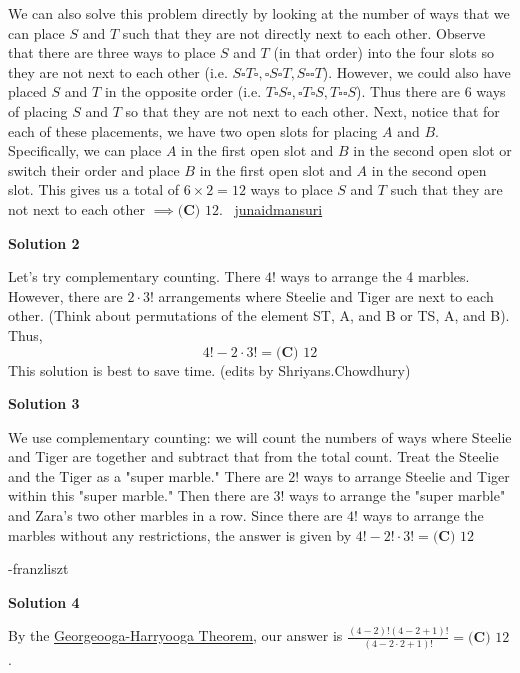 \begin{enumerate}
 We can also solve this problem directly by looking at the number of ways that we can place $S$ and $T$ such that they are not directly next to each other. Observe that there are three ways to place $S$ and $T$ (in that order) into the four slots so they are not next to each other (i.e. $S\square T\square, \square S\square T, S\square\square T$). However, we could also have placed $S$ and $T$ in the opposite order (i.e. $T\square S\square, \square T\square S, T\square\square S$). Thus there are 6 ways of placing $S$ and $T$ so that they are not next to each other. Next, notice that for each of these placements, we have two open slots for placing $A$ and $B$. Specifically, we can place $A$ in the first open slot and $B$ in the second open slot or switch their order and place $B$ in the first open slot and $A$ in the second open slot. This gives us a total of $6\times 2=12$ ways to place $S$ and $T$ such that they are not next to each other $\implies\boxed{\textbf{(C) }12}$.
~\href{https://artofproblemsolving.com/community/user/jmansuri}{junaidmansuri}

 



\textbf{Solution 2}

Let's try complementary counting. There $4!$ ways to arrange the 4 marbles. However, there are $2\cdot3!$ arrangements where Steelie and Tiger are next to each other. (Think about permutations of the element ST, A, and B or TS, A, and B). Thus, 
 \[4!-2\cdot3!=\boxed{\textbf{(C) }12}\] This solution is best to save time. (edits by Shriyans.Chowdhury)

 



\textbf{Solution 3}

We use complementary counting: we will count the numbers of ways where Steelie and Tiger are together and subtract that from the total count. Treat the Steelie and the Tiger as a "super marble." There are $2!$ ways to arrange Steelie and Tiger within this "super marble." Then there are $3!$ ways to arrange the "super marble" and Zara's two other marbles in a row. Since there are $4!$ ways to arrange the marbles without any restrictions, the answer is given by $4!-2!\cdot 3!=\boxed{\textbf{(C) }12}$

 -franzliszt

 



\textbf{Solution 4}

By the \href{https://artofproblemsolving.com/wiki/index.php?title=Georgeooga-Harryooga\_Theorem}{Georgeooga-Harryooga Theorem}, our answer is $\frac{(4-2)!(4-2+1)!}{(4-2\cdot2+1)!}=\boxed{\textbf{(C) }12}$.


\end{enumerate}
